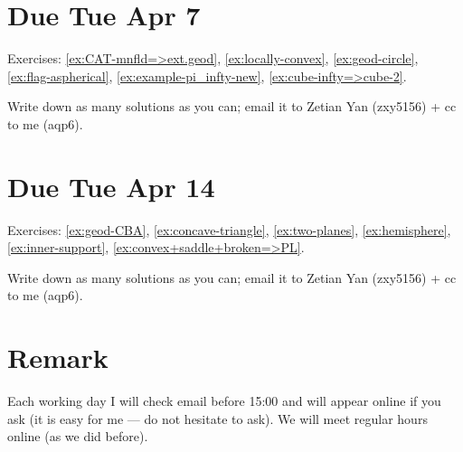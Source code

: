 \section{Due Tue Apr 7}

Exercises: 
\ref{ex:CAT-mnfld=>ext.geod},
\ref{ex:locally-convex},
\ref{ex:geod-circle},
\ref{ex:flag-aspherical},
\ref{ex:example-pi_infty-new},
\ref{ex:cube-infty=>cube-2}.

Write down as many solutions as you can; email it to Zetian Yan (zxy5156) + cc to me (aqp6).

\section{Due Tue Apr 14}

Exercises: 
\ref{ex:geod-CBA},
\ref{ex:concave-triangle},
\ref{ex:two-planes},
\ref{ex:hemisphere},
\ref{ex:inner-support},
\ref{ex:convex+saddle+broken=>PL}.

Write down as many solutions as you can; email it to Zetian Yan (zxy5156) + cc to me (aqp6).

\section*{Remark}
Each working day I will check email before 15:00 and will appear online if you ask (it is easy for me --- do not hesitate to ask).
We will meet regular hours online (as we did before).
